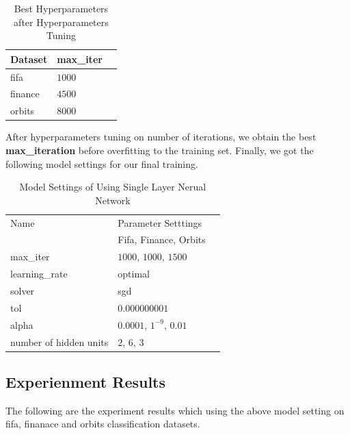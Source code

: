 \documentclass{article}
\begin{document}
\pagebreak

\begin{table}[htb]
	\caption{Best Hyperparameters after Hyperparameters Tuning}
	\label{sample-table}
	\centering
	\begin{tabular}{lll}
		\toprule
		\cmidrule{1-2}
		Dataset     &  max\_iter	\\
		\midrule
		fifa & $1000$  \\
		finance & $4500$        \\
		orbits & $8000$ \\
		\bottomrule
	\end{tabular}
\end{table}

After hyperparameters tuning on number of iterations, we obtain the best \textbf{max\_iteration} before overfitting to the training set. Finally, we got the following model settings for our final training.

\begin{table}[h]
	\caption{Model Settings of Using Single Layer Nerual Network }
	\label{sample-table}
	\centering
	\begin{tabular}{lll}
		\toprule
		\cmidrule{1-2}
		Name     &  Parameter Setttings	\\
		\cmidrule{1-2}
		 &  Fifa, Finance, Orbits	\\
		\midrule
		max\_iter & $1000$, $1000$, $1500$  \\
		learning\_rate & optimal \\
		solver & sgd \\
		tol & $0.000000001$ \\
		alpha & $0.0001$, $1^{-9}$, $0.01$   \\
		number of hidden units & $2$, $6$, $3$    \\
		\bottomrule
	\end{tabular}
\end{table}



\subsection{Experienment Results}

The following are the experiment results which using the above model setting on fifa, finanace and orbits classification datasets.
\end{document}
